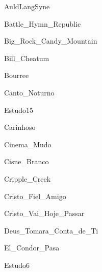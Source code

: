\documentclass{scrartcl}
\begin{document}

{AuldLangSyne}


{Battle_Hymn_Republic}


{Big_Rock_Candy_Mountain}


{Bill_Cheatum}


{Bourree}


{Canto_Noturno}


{Estudo15}


{Carinhoso}


{Cinema_Mudo}


{Cisne_Branco}


{Cripple_Creek}


{Cristo_Fiel_Amigo}


{Cristo_Vai_Hoje_Passar}


{Deus_Tomara_Conta_de_Ti}


{El_Condor_Pasa}


{Estudo6}
\end{document}
